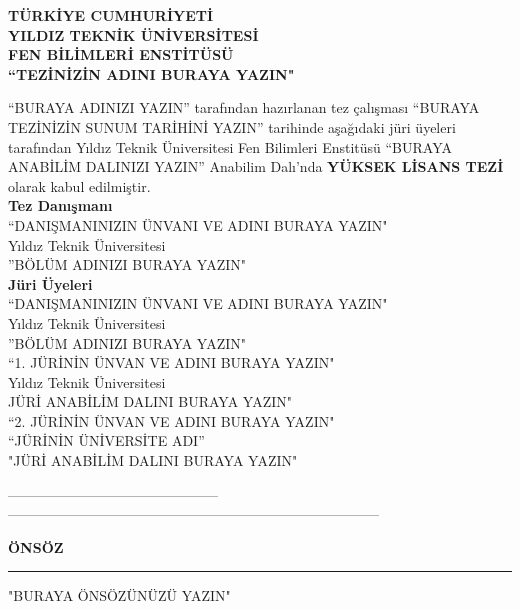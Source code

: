 \documentclass[12pt]{report}
\begin{document}
\begin{titlepage}
\begin{center}
\uppercase{\bfseries\large TÜRKİYE CUMHURİYETİ\\ YILDIZ TEKNİK ÜNİVERSİTESİ\\ FEN BİLİMLERİ ENSTİTÜSÜ}\\[1.5cm]
\uppercase{\bfseries\large ``TEZİNİZİN ADINI BURAYA YAZIN"}\\[1.5cm]
\end{center}
\begin{singlespacing}
\textnormal{``BURAYA ADINIZI YAZIN'' tarafından hazırlanan tez çalışması ``BURAYA TEZİNİZİN SUNUM TARİHİNİ YAZIN'' tarihinde aşağıdaki jüri üyeleri tarafından Yıldız Teknik Üniversitesi Fen Bilimleri Enstitüsü ``BURAYA ANABİLİM DALINIZI YAZIN'' Anabilim Dalı'nda \textbf{YÜKSEK LİSANS TEZİ} olarak kabul edilmiştir.}\\[1.5cm] %
\textbf{Tez Danışmanı}\\
\textnormal{``DANIŞMANINIZIN ÜNVANI VE ADINI BURAYA YAZIN"\\ Yıldız Teknik Üniversitesi\\''BÖLÜM ADINIZI BURAYA YAZIN"}\\[1.5cm]
\textbf{Jüri Üyeleri}\\
\textnormal{``DANIŞMANINIZIN ÜNVANI VE ADINI BURAYA YAZIN"\\ Yıldız Teknik Üniversitesi\\''BÖLÜM ADINIZI BURAYA YAZIN"}\\[1.5cm]
\textnormal{``1. JÜRİNİN ÜNVAN VE ADINI BURAYA YAZIN"\\ Yıldız Teknik Üniversitesi\\JÜRİ ANABİLİM DALINI BURAYA YAZIN"}\\[1.5cm]
\textnormal{``2. JÜRİNİN ÜNVAN VE ADINI BURAYA YAZIN"\\ ``JÜRİNİN ÜNİVERSİTE ADI''\\"JÜRİ ANABİLİM DALINI BURAYA YAZIN"}\\[1.5cm]
\end{singlespacing}
\end{titlepage}
---------------------------------------------%
--------------------------------------------------------------------------------

\begin{titlepage}
\shorthandoff{=}
\topmargin=80pt
\shorthandon{=}
\begin{flushright}
\uppercase{\bfseries{\large önsöz}}\\[0.5cm]
\hrule
\vspace{2ex}%
\end{flushright}
\begin{singlespacing}
"BURAYA ÖNSÖZÜNÜZÜ YAZIN"

\end{singlespacing}
\end{titlepage}
\end{document}
